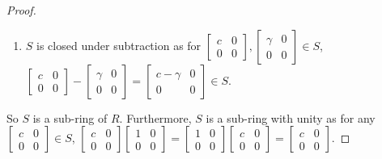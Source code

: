 \documentclass{article}
\theoremstyle{definition}
\theoremstyle{plain}
\begin{document}
\begin{proof}
\begin{enumerate}
			\item $S$ is closed under subtraction as for $\left[ \begin{smallmatrix} c & 0 \\ 0 & 0\end{smallmatrix} \right], \left[ \begin{smallmatrix} \gamma & 0 \\ 0 & 0\end{smallmatrix} \right] \in S$, $\left[ \begin{smallmatrix} c & 0 \\ 0 & 0\end{smallmatrix} \right] - \left[ \begin{smallmatrix} \gamma & 0 \\ 0 & 0\end{smallmatrix} \right] = \left[ \begin{smallmatrix} c - \gamma & 0 \\ 0 & 0\end{smallmatrix} \right] \in S$. \checkmark 
		\end{enumerate} So $S$ is a sub-ring of $R$. Furthermore, $S$ is a sub-ring with unity as for any $\left[ \begin{smallmatrix} c & 0 \\ 0 & 0\end{smallmatrix} \right] \in S$, $\left[ \begin{smallmatrix} c & 0 \\ 0 & 0\end{smallmatrix} \right] \left[ \begin{smallmatrix} 1 & 0 \\ 0 & 0\end{smallmatrix} \right] = \left[ \begin{smallmatrix} 1 & 0 \\ 0 & 0\end{smallmatrix} \right] \left[ \begin{smallmatrix} c & 0 \\ 0 & 0\end{smallmatrix} \right] = \left[ \begin{smallmatrix} c & 0 \\ 0 & 0\end{smallmatrix} \right]$.
	\end{proof}
	
\end{document}

